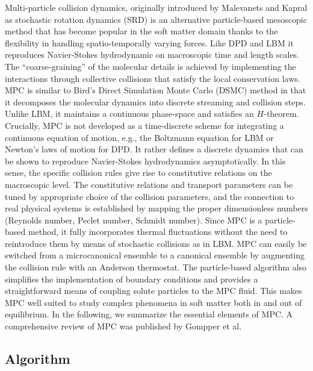 \documentclass[8.5pt,twoside,twocolumn]{article}
\begin{document}
Multi-particle collision dynamics, originally introduced by Malevanets and Kapral\cite{Malevanets:1999,Malevanets:2001:Gompper2009} as stochastic rotation dynamics (SRD) is an alternative particle-based mesoscopic method that has become popular in the soft matter domain thanks to the flexibility in handling spatio-temporally varying forces. Like DPD and LBM it reproduces Navier-Stokes hydrodynamic on macroscopic time and length scales. The ``coarse-graining'' of the molecular details is achieved by implementing the interactions through collective collisions that satisfy the local conservation laws. MPC is similar to Bird's Direct Simulation Monte Carlo (DSMC) method \cite{Bird:1994} in that it decomposes the molecular dynamics into discrete streaming and collision steps. Unlike LBM, it maintains a continuous phase-space and satisfies an $H$-theorem.\cite{Malevanets:1999,Ihle:2003} Crucially, MPC is not developed as a time-discrete scheme for integrating a continuous equation of motion, e.g., the Boltzmann equation for LBM or Newton's laws of motion for DPD. It rather defines a discrete dynamics that can be shown to reproduce Navier-Stokes hydrodynamics asymptotically. In this sense, the specific collision rules give rise to constitutive relations on the macroscopic level. The constitutive relations and transport parameters can be tuned by appropriate choice of the collision parameters, and the connection to real physical systems is established by mapping the proper dimensionless numbers (Reynolds number, Peclet number, Schmidt number).\cite{Padding:2006} Since MPC is a particle-based method, it fully incorporates thermal fluctuations without the need to reintroduce them by means of stochastic collisions as in LBM.\cite{Ladd:1994a,Adhikari:2005,Duenweg:2007,Duenweg:2008a,Gross:2010} MPC can easily be switched from a microcanonical ensemble to a canonical ensemble by augmenting the collision rule with an Anderson thermostat. The particle-based algorithm also simplifies the implementation of boundary conditions and provides a straightforward means of coupling solute particles to the MPC fluid. This makes MPC well suited to study complex phenomena in soft matter both in and out of equilibrium.
%
In the following, we summarize the essential elements of MPC. A comprehensive review of MPC was published by Gompper et al.\cite{Gompper:2009}

\subsection{Algorithm}
\end{document}
